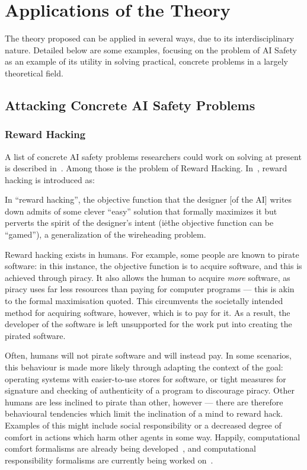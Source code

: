 \section{Applications of the Theory}
The theory proposed can be applied in several ways, due to its interdisciplinary nature. Detailed below are some examples, focusing on the problem of AI Safety as an example of its utility in solving practical, concrete problems in a largely theoretical field.\par

\subsection{Attacking Concrete AI Safety Problems}

\subsubsection{Reward Hacking}
A list of concrete AI safety problems researchers could work on solving at present is described in~\cite{concrete_problems}. Among those is the problem of Reward Hacking. In~\cite{concrete_problems}, reward hacking is introduced as:

\begin{displayquote}
In ``reward hacking'', the objective function that the designer [of the AI] writes down admits of some clever ``easy'' solution that formally maximizes it but perverts the spirit of the designer’s intent (i\.e\. the objective function can be ``gamed''), a generalization of the wireheading problem.
\end{displayquote}

Reward hacking exists in humans. For example, some people are known to pirate software: in this instance, the objective function is to acquire software, and this is achieved through piracy. It also allows the human to acquire \emph{more} software, as piracy uses far less resources than paying for computer programs --- this is akin to the formal maximisation quoted. This circumvents the societally intended method for acquiring software, however, which is to pay for it. As a result, the developer of the software is left unsupported for the work put into creating the pirated software.\par

Often, humans will not pirate software and will instead pay. In some scenarios, this behaviour is made more likely through adapting the context of the goal: operating systems with easier-to-use stores for software, or tight measures for signature and checking of authenticity of a program to discourage piracy. Other humans are less inclined to pirate than other, however --- there are therefore behavioural tendencies which limit the inclination of a mind to reward hack. Examples of this might include social responsibility or a decreased degree of comfort in actions which harm other agents in some way. Happily, computational comfort formalisms are already being developed~\citep{Marsh2011}, and computational responsibility formalisms are currently being worked on~\citep{wallis_responsibility}.\par

